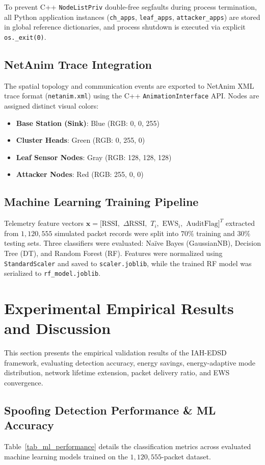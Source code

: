 \documentclass[journal]{IEEEtran}
\begin{document}
To prevent C++ \texttt{NodeListPriv} double-free segfaults during process termination, all Python application instances (\texttt{ch\_apps}, \texttt{leaf\_apps}, \texttt{attacker\_apps}) are stored in global reference dictionaries, and process shutdown is executed via explicit \texttt{os.\_exit(0)}.

\subsection{NetAnim Trace Integration}
The spatial topology and communication events are exported to NetAnim XML trace format (\texttt{netanim.xml}) using the C++ \texttt{AnimationInterface} API. Nodes are assigned distinct visual colors:
\begin{itemize}
    \item \textbf{Base Station (Sink)}: Blue (RGB: 0, 0, 255)
    \item \textbf{Cluster Heads}: Green (RGB: 0, 255, 0)
    \item \textbf{Leaf Sensor Nodes}: Gray (RGB: 128, 128, 128)
    \item \textbf{Attacker Nodes}: Red (RGB: 255, 0, 0)
\end{itemize}

\subsection{Machine Learning Training Pipeline}
Telemetry feature vectors $\mathbf{x} = [\text{RSSI},$ $\Delta \text{RSSI},$ $T_i,$ $\text{EWS}_i,$ $\text{AuditFlag}]^T$ extracted from $1,120,555$ simulated packet records were split into $70\%$ training and $30\%$ testing sets. Three classifiers were evaluated: Na\"ive Bayes (GaussianNB), Decision Tree (DT), and Random Forest (RF). Features were normalized using \texttt{StandardScaler} and saved to \texttt{scaler.joblib}, while the trained RF model was serialized to \texttt{rf\_model.joblib}.

\section{Experimental Empirical Results and Discussion}
\label{sec_results}

This section presents the empirical validation results of the IAH-EDSD framework, evaluating detection accuracy, energy savings, energy-adaptive mode distribution, network lifetime extension, packet delivery ratio, and EWS convergence.

\subsection{Spoofing Detection Performance \& ML Accuracy}
Table~\ref{tab_ml_performance} details the classification metrics across evaluated machine learning models trained on the $1,120,555$-packet dataset.
\end{document}
